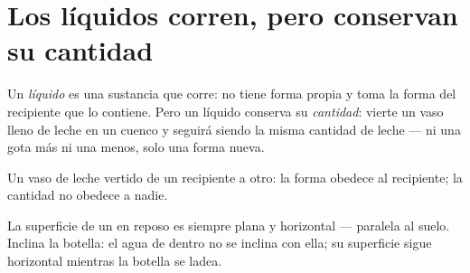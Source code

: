 \section{Los líquidos corren, pero conservan su cantidad}

\begin{definition}[Líquido]\label{def:g3:solids-liquids-gases:liquid}
Un \emph{líquido} es una sustancia que corre: no tiene
forma propia y toma la forma del recipiente que lo contiene. Pero un
líquido conserva su \emph{cantidad}: vierte un vaso lleno de leche en
un cuenco y seguirá siendo la misma cantidad de leche --- ni una gota
más ni una menos, solo una forma nueva.
\end{definition}

\begin{omfigure}

{\small Un vaso de leche vertido de un recipiente a otro: la forma
obedece al recipiente; la cantidad no obedece a nadie.}
\end{omfigure}

\begin{proposition}\label{prop:g3:solids-liquids-gases:level}
La superficie de un  en reposo es siempre plana y horizontal
--- paralela al suelo. Inclina la botella: el agua de dentro no se
inclina con ella; su superficie sigue horizontal mientras la botella
se ladea.
\end{proposition}

